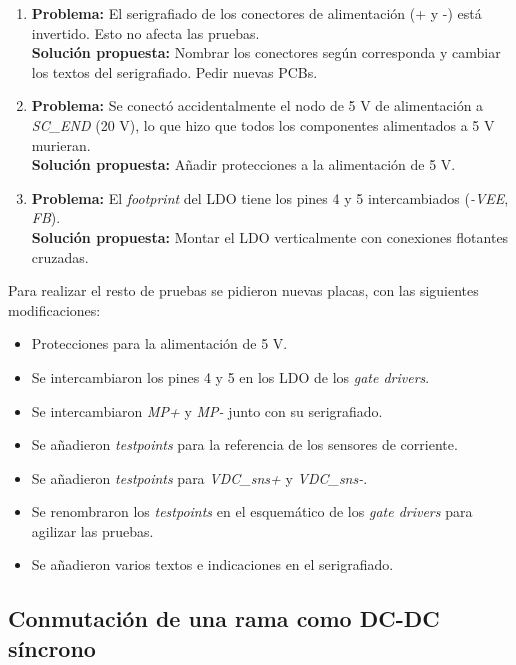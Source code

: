 \begin{enumerate}
	\item \textbf{Problema:} El serigrafiado de los conectores de alimentación (+ y -) está invertido. Esto no afecta las pruebas. \\
	\textbf{Solución propuesta:} Nombrar los conectores según corresponda y cambiar los textos del serigrafiado. Pedir nuevas PCBs.
	
	\item \textbf{Problema:} Se conectó accidentalmente el nodo de 5 V de alimentación a \textit{SC\_END} (20 V), lo  que hizo que todos los componentes alimentados a 5 V murieran.\\
	\textbf{Solución propuesta:} Añadir protecciones a la alimentación de 5 V.
	
	\item\textbf{Problema:} El \textit{footprint} del LDO tiene los pines 4 y 5 intercambiados (\textit{-VEE}, \textit{FB}). \\
	\textbf{Solución propuesta:} Montar el LDO verticalmente con conexiones flotantes cruzadas.
\end{enumerate}

Para realizar el resto de pruebas se pidieron nuevas placas, con las siguientes modificaciones:

\begin{itemize}
	\item Protecciones para la alimentación de 5 V.
	\item Se intercambiaron los pines 4 y 5 en los LDO de los \textit{gate drivers}.
	\item Se intercambiaron \textit{MP+} y \textit{MP-} junto con su serigrafiado.
	\item Se añadieron \textit{testpoints} para la referencia de los sensores de corriente.
	\item Se añadieron \textit{testpoints} para \textit{VDC\_sns+} y \textit{VDC\_sns-}.
	\item Se renombraron los \textit{testpoints} en el esquemático de los \textit{gate drivers} para agilizar las pruebas.
	\item Se añadieron varios textos e indicaciones en el serigrafiado.
\end{itemize}

\subsection{Conmutación de una rama como DC-DC síncrono}
	
